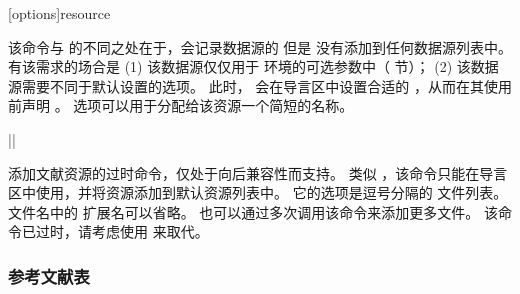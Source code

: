 \begin{ltxsyntax}
[options]{resource}


该命令与  的不同之处在于，会记录数据源的  但是  没有添加到任何数据源列表中。
有该需求的场合是 (1) 该数据源仅仅用于  环境的可选参数中（ 节）；
(2) 该数据源需要不同于默认设置的选项。
此时， 会在导言区中设置合适的 ，从而在其使用前声明 。
 选项可以用于分配给该资源一个简短的名称。

|\DeprecatedMark|


添加文献资源的过时命令，仅处于向后兼容性而支持。
类似 ，该命令只能在导言区中使用，并将资源添加到默认资源列表中。
它的选项是逗号分隔的  文件列表。
文件名中的  扩展名可以省略。
也可以通过多次调用该命令来添加更多文件。
该命令已过时，请考虑使用  来取代。

\end{ltxsyntax}

\subsubsection{参考文献表}%
\label{use:bib:bib}

